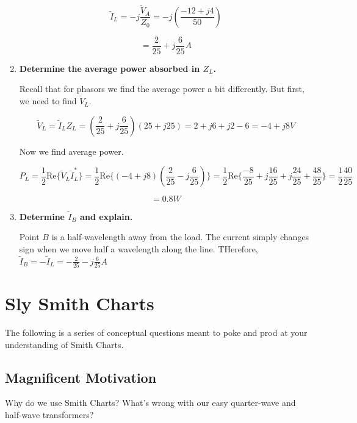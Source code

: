 \documentclass{article}
\begin{document}
\begin{enumerate}
    $$\tilde{I}_L = -j \frac{\tilde{V}_A}{Z_0} = -j \left(\frac{-12 + j4}{50}\right)$$

    $$= \boxed{\frac{2}{25} + j\frac{6}{25} A}$$

    \vfill
    
    \item \textbf{Determine the average power absorbed in $Z_L$.}

    Recall that for phasors we find the average power a bit differently. But first, we need to find $\tilde{V}_L$.

    $$\tilde{V}_L = \tilde{I}_L Z_L = \left(\frac{2}{25} + j\frac{6}{25}\right)\left(25 + j25 \right) = 2 + j6 + j2 - 6 = -4 + j8 V$$

    Now we find average power.

    $$P_L = \frac{1}{2} \text{Re}\{\tilde{V}_L \tilde{I}_L^*\} = \frac{1}{2} \text{Re}\{(-4 + j8) \left(\frac{2}{25} - j\frac{6}{25}\right)\} = \frac{1}{2} \text{Re}\{\frac{-8}{25} + j\frac{16}{25} + j\frac{24}{25} + \frac{48}{25}\} = \frac{1}{2} \frac{40}{25}$$

    $$= \boxed{0.8 W}$$

    \vfill
    
    \item \textbf{Determine $\tilde{I}_B$ and explain.}

    Point $B$ is a half-wavelength away from the load. The current simply changes sign when we move half a wavelength along the line. THerefore, $\tilde{I}_B = -\tilde{I}_L = \boxed{-\frac{2}{25} - j\frac{6}{25} A}$

    \vfill
    \newpage
    
\end{enumerate}

\newpage

\section{Sly Smith Charts}
\label{section:smith_chart}

The following is a series of conceptual questions meant to poke and prod at your understanding of Smith Charts.

\subsection{Magnificent Motivation}

Why do we use Smith Charts? What's wrong with our easy quarter-wave and half-wave transformers?
\end{document}

